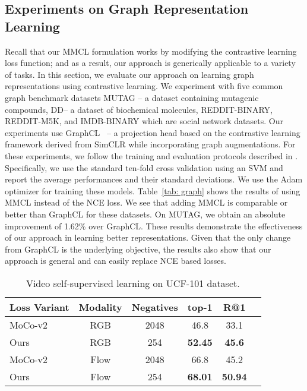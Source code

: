 \documentclass[letterpaper]{article} \usepackage{aaai22}  \usepackage{times}  \usepackage{helvet}  \usepackage{courier}  \usepackage[hyphens]{url}  \usepackage{graphicx} \urlstyle{rm} \def\UrlFont{\rm}  \usepackage{natbib}  \usepackage{caption} \DeclareCaptionStyle{ruled}{labelfont=normalfont,labelsep=colon,strut=off} \frenchspacing  \setlength{\pdfpagewidth}{8.5in}  \setlength{\pdfpageheight}{11in}
\begin{document}
\subsection{Experiments on Graph Representation Learning}
Recall that our MMCL formulation works by modifying the contrastive learning loss function; and as a result, our approach is generically applicable to a variety of tasks. In this section, we evaluate our approach on learning graph representations using contrastive learning. We experiment with five common graph benchmark datasets MUTAG \cite{Kriege2012SubgraphMK} -- a dataset containing mutagenic compounds, DD\cite{yanardag2015deep}-- a dataset of biochemical molecules, REDDIT-BINARY, REDDIT-M5K, and IMDB-BINARY \cite{yanardag2015deep} which are social network datasets. Our experiments use GraphCL~\cite{you2020graph} --  a projection head based on the contrastive learning framework derived from SimCLR while incorporating graph augmentations.
For these experiments, we follow the training and evaluation protocols described in \cite{you2020graph}. Specifically, we use the standard ten-fold cross validation using an SVM and report the average performances and their standard deviations. We use the Adam optimizer for training these models. Table~\ref{tab: graph} shows the results of using MMCL instead of the NCE loss. We see that adding MMCL is comparable or better than GraphCL for these datasets. On MUTAG, we obtain an absolute improvement of 1.62\% over GraphCL. These results demonstrate the effectiveness of our approach in learning better representations. Given that the only change from GraphCL is the underlying objective, the results also show that our approach is general and can easily replace NCE based losses.
\begin{table}[!htb]
    \centering
    \begin{tabular}{lccccr}
        \toprule
        Loss Variant & Modality & Negatives & top-1 & R@1\\
        \toprule
        MoCo-v2 & RGB & 2048 & 46.8 & 33.1\\
        Ours & RGB & 254 & \textbf{52.45} & \textbf{45.6} \\
        \midrule
        MoCo-v2 & Flow & 2048 & 66.8 & 45.2\\
        Ours& Flow & 254 & \textbf{68.01} & \textbf{50.94} \\
        \bottomrule
        \end{tabular}
        \caption{Video self-supervised learning on UCF-101 dataset.}
    \label{tab: videossl}
\end{table}
\end{document}

